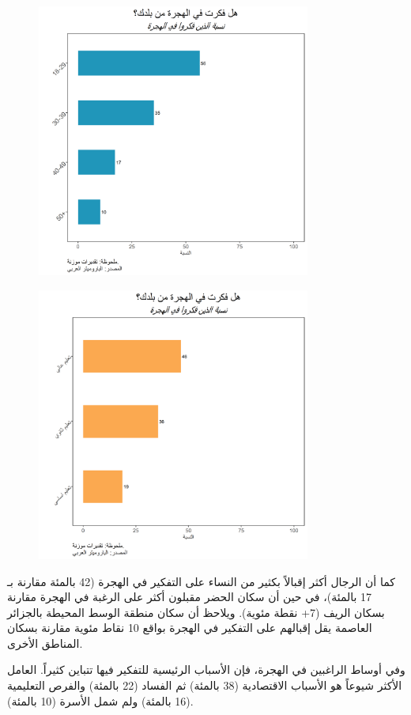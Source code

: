 \documentclass{article}
\begin{document}
			\begin{figure}[H]
				\centering
				\includegraphics[width=9cm]{Q104_age.png} 
			\end{figure}
	\begin{figure}[H]
	      \centering
				\includegraphics[width=9cm]{Q104_education.png}
			\end{figure}
			
 كما أن الرجال أكثر إقبالاً بكثير من النساء على التفكير في الهجرة (42 بالمئة مقارنة بـ 17 بالمئة)، في حين أن سكان الحضر مقبلون أكثر على الرغبة في الهجرة مقارنة بسكان الريف (7+ نقطة مئوية). ويلاحظ أن سكان منطقة الوسط المحيطة بالجزائر العاصمة يقل إقبالهم على التفكير في الهجرة بواقع 10 نقاط مئوية مقارنة بسكان المناطق الأخرى.
	
 وفي أوساط الراغبين في الهجرة، فإن الأسباب الرئيسية للتفكير فيها تتباين كثيراً. العامل الأكثر شيوعاً هو الأسباب الاقتصادية (38 بالمئة) ثم الفساد (22 بالمئة) والفرص التعليمية (16 بالمئة) ولم شمل الأسرة (10 بالمئة).
	
\end{document}
